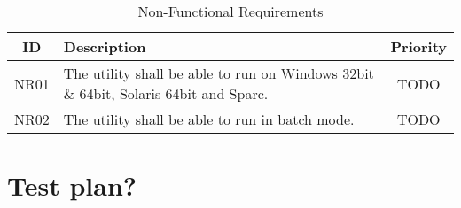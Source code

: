 \begin{table}[h] \center
\caption{Non-Functional Requirements\label{tab:nonfuncreq}}
\begin{tabular}{| c | p{11cm} | c |}
	\hline ID & Description & Priority \\
	\hline NR01 & The utility shall be able to run on Windows 32bit \& 64bit,
		Solaris 64bit and Sparc. & TODO \\
	\hline NR02 & The utility shall be able to run in batch mode. & TODO \\
	\hline
\end{tabular}
\end{table}

\chapter{Test plan?}

